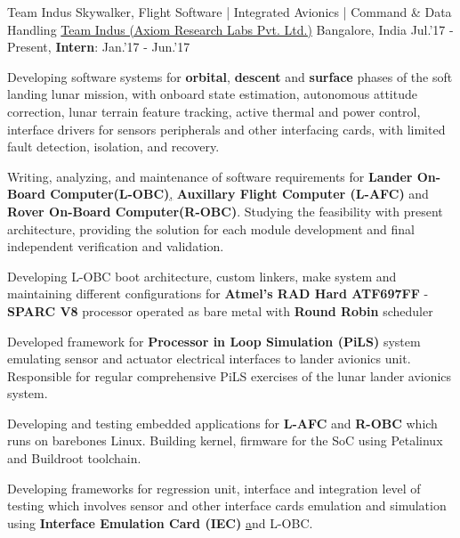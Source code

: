 \begin{cventries}
	\cventry
	{Team Indus Skywalker, Flight Software | Integrated Avionics | Command \& Data Handling}
	{\href{http://www.teamindus.in/}{Team Indus (Axiom Research Labs Pvt. Ltd.)}}
	{Bangalore, India}
	{Jul.'17 - Present, \textbf{Intern}: Jan.'17 - Jun.'17}
	{
		\begin{cvitems}
			\item{Developing software systems for \textbf{orbital}, \textbf{descent} and \textbf{surface} phases of the soft landing lunar mission, with onboard state estimation, autonomous attitude correction, lunar terrain feature tracking, active thermal and power control, interface drivers for sensors peripherals and other interfacing cards, with limited fault detection, isolation, and recovery.}
			\item{Writing, analyzing, and maintenance of software requirements for \textbf{Lander On-Board Computer(L-OBC)}\href{http://ww1.microchip.com/downloads/en/DeviceDoc/ATF697FF.pdf}, \textbf{Auxillary Flight Computer (L-AFC)} and \textbf{Rover On-Board Computer(R-OBC)}. Studying the feasibility with present architecture, providing the solution for each module development and final independent verification and validation.}
			\item{Developing L-OBC boot architecture, custom linkers, make system and maintaining different configurations for \textbf{Atmel's RAD Hard ATF697FF} - \textbf{SPARC V8} processor operated as bare metal with \textbf{Round Robin} scheduler}
			\item{Developed framework for \textbf{Processor in Loop Simulation (PiLS)} system emulating sensor and actuator electrical interfaces to lander avionics unit. Responsible for regular comprehensive PiLS exercises of the lunar lander avionics system.}
			\item{Developing and testing embedded applications for \textbf{L-AFC} and \textbf{R-OBC} which runs on barebones Linux. Building kernel, firmware for the SoC using Petalinux and Buildroot toolchain.}
			\item{Developing frameworks for regression unit, interface and integration level of testing which involves sensor and other interface cards emulation and simulation using \textbf{Interface Emulation Card (IEC) }\href{http://zedboard.org/product/microzed/} and L-OBC.}
		\end{cvitems}
	}
\end{cventries}
